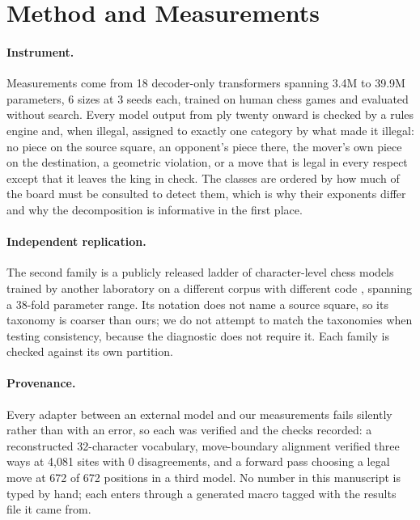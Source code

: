 \documentclass[11pt]{article}
\begin{document}
\section{Method and Measurements}
\label{sec:method}

\paragraph{Instrument.}
Measurements come from 18 decoder-only transformers spanning
3.4M to 39.9M parameters, 6 sizes at
3 seeds each, trained on human chess games and evaluated without
search. Every model output from ply twenty onward is checked by a rules engine and,
when illegal, assigned to exactly one category by what made it illegal: no piece on
the source square, an opponent's piece there, the mover's own piece on the
destination, a geometric violation, or a move that is legal in every respect except
that it leaves the king in check. The classes are ordered by how much of the board
must be consulted to detect them, which is why their exponents differ and why the
decomposition is informative in the first place.

\paragraph{Independent replication.}
The second family is a publicly released ladder of character-level chess models
trained by another laboratory on a different corpus with different code
\citep{karvonen2024emergent}, spanning a 38-fold parameter range. Its
notation does not name a source square, so its taxonomy is coarser than ours; we do
not attempt to match the taxonomies when testing consistency, because the
diagnostic does not require it. Each family is checked against its own partition.

\paragraph{Provenance.}
Every adapter between an external model and our measurements fails silently rather
than with an error, so each was verified and the checks recorded: a reconstructed
32-character vocabulary, move-boundary alignment verified three ways
at 4,081 sites with 0 disagreements, and a
forward pass choosing a legal move at 672 of 672
positions in a third model. No number in this manuscript is typed by hand; each
enters through a generated macro tagged with the results file it came from.
\end{document}
